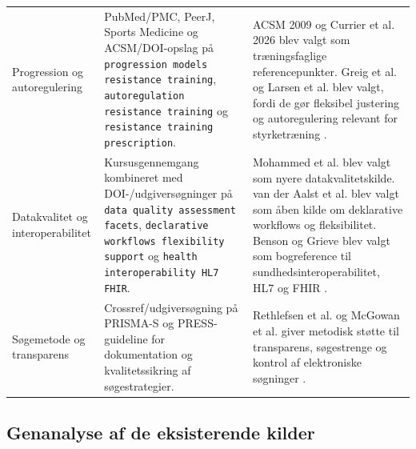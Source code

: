 \begin{center}
\scriptsize
\begin{tabularx}{\textwidth}{>{\RaggedRight\arraybackslash}p{} >{\RaggedRight\arraybackslash}p{} Y}
\toprule
{} &  &  \\
\midrule
Progression og autoregulering & PubMed/PMC, PeerJ, Sports Medicine og ACSM/DOI-opslag på \texttt{progression models resistance training}, \texttt{autoregulation resistance training} og \texttt{resistance training prescription}. & ACSM 2009 og Currier et al. 2026 blev valgt som træningsfaglige referencepunkter. Greig et al. og Larsen et al. blev valgt, fordi de gør fleksibel justering og autoregulering relevant for styrketræning \cite{acsm2009_progression_models,currier2026_acsm_resistance_training,greig2020_autoregulation_resistance_training,larsen2021_autoregulation_systematic_review}. \\
Datakvalitet og interoperabilitet & Kursusgennemgang kombineret med DOI-/udgiversøgninger på \texttt{data quality assessment facets}, \texttt{declarative workflows flexibility support} og \texttt{health interoperability HL7 FHIR}. & Mohammed et al. blev valgt som nyere datakvalitetskilde. van der Aalst et al. blev valgt som åben kilde om deklarative workflows og fleksibilitet. Benson og Grieve blev valgt som bogreference til sundhedsinteroperabilitet, HL7 og FHIR \cite{mohammed2025_five_facets_data_quality,vanderalst2009_declarative_workflows,benson2016_principles_health_interoperability}. \\
Søgemetode og transparens & Crossref/udgiversøgning på PRISMA-S og PRESS-guideline for dokumentation og kvalitetssikring af søgestrategier. & Rethlefsen et al. og McGowan et al. giver metodisk støtte til transparens, søgestrenge og kontrol af elektroniske søgninger \cite{rethlefsen2021_prisma_s,mcgowan2016_press_guideline_statement}. \\
\bottomrule
\end{tabularx}
\label{tab:kildesoegning-progression-data-metode}
\end{center}

\subsection{Genanalyse af de eksisterende kilder}

